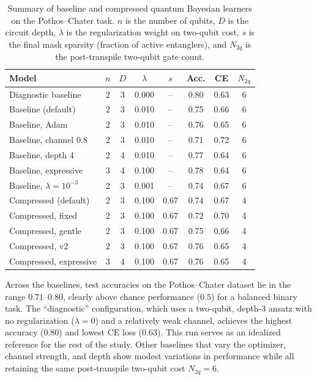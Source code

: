 \documentclass[conference]{IEEEtran}
\begin{document}
\begin{table}[H]
\centering
\caption{Summary of baseline and compressed quantum Bayesian learners on the Pothos--Chater task. $n$ is the number of qubits, $D$ is the circuit depth, $\lambda$ is the regularization weight on two-qubit cost, $s$ is the final mask sparsity (fraction of active entanglers), and $N_{2q}$ is the post-transpile two-qubit gate count.}
\label{tab:main-summary}
\begin{tabular}{lccccccc}
\toprule
                      Model & $n$ & $D$ & $\lambda$ &   $s$ & Acc. &   CE & $N_{2q}$ \\
\midrule
        Diagnostic baseline &   2 &   3 &     0.000 &    -- & 0.80 & 0.63 &        6 \\
         Baseline (default) &   2 &   3 &     0.010 &    -- & 0.75 & 0.66 &        6 \\
             Baseline, Adam &   2 &   3 &     0.010 &    -- & 0.76 & 0.65 &        6 \\
      Baseline, channel 0.8 &   2 &   3 &     0.010 &    -- & 0.71 & 0.72 &        6 \\
          Baseline, depth 4 &   2 &   4 &     0.010 &    -- & 0.77 & 0.64 &        6 \\
       Baseline, expressive &   3 &   4 &     0.100 &    -- & 0.78 & 0.64 &        6 \\
Baseline, $\lambda=10^{-3}$ &   2 &   3 &     0.001 &    -- & 0.74 & 0.67 &        6 \\
       Compressed (default) &   2 &   3 &     0.100 &  0.67 & 0.74 & 0.67 &        4 \\
          Compressed, fixed &   2 &   3 &     0.100 &  0.67 & 0.72 & 0.70 &        4 \\
         Compressed, gentle &   2 &   3 &     0.100 &  0.67 & 0.75 & 0.66 &        4 \\
             Compressed, v2 &   2 &   3 &     0.100 &  0.67 & 0.76 & 0.65 &        4 \\
     Compressed, expressive &   3 &   4 &     0.100 &  0.67 & 0.76 & 0.65 &        4 \\
\bottomrule
\end{tabular}
\end{table}

Across the baselines, test accuracies on the Pothos--Chater dataset lie in the
range $0.71$--$0.80$, clearly above chance performance ($0.5$) for a balanced
binary task. The ``diagnostic'' configuration, which uses a two-qubit,
depth-$3$ ansatz with no regularization ($\lambda=0$) and a relatively weak
channel, achieves the highest accuracy (0.80) and lowest CE loss (0.63). This
run serves as an idealized reference for the rest of the study. Other baselines
that vary the optimizer, channel strength, and depth show modest variations in
performance while all retaining the same post-transpile two-qubit cost
$N_{2q} = 6$.
\end{document}
